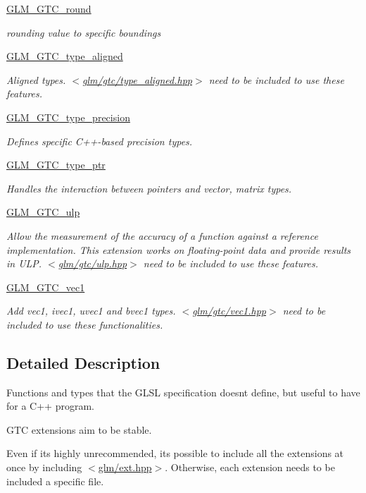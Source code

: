 \begin{DoxyCompactItemize}
\mbox{\hyperlink{group__gtc__round}{G\+L\+M\+\_\+\+G\+T\+C\+\_\+round}}
\begin{DoxyCompactList}\small\item\em rounding value to specific boundings \end{DoxyCompactList}\item 
\mbox{\hyperlink{group__gtc__type__aligned}{G\+L\+M\+\_\+\+G\+T\+C\+\_\+type\+\_\+aligned}}
\begin{DoxyCompactList}\small\item\em Aligned types. $<$\mbox{\hyperlink{gtc_2type__aligned_8hpp}{glm/gtc/type\+\_\+aligned.\+hpp}}$>$ need to be included to use these features. \end{DoxyCompactList}\item 
\mbox{\hyperlink{group__gtc__type__precision}{G\+L\+M\+\_\+\+G\+T\+C\+\_\+type\+\_\+precision}}
\begin{DoxyCompactList}\small\item\em Defines specific C++-\/based precision types. \end{DoxyCompactList}\item 
\mbox{\hyperlink{group__gtc__type__ptr}{G\+L\+M\+\_\+\+G\+T\+C\+\_\+type\+\_\+ptr}}
\begin{DoxyCompactList}\small\item\em Handles the interaction between pointers and vector, matrix types. \end{DoxyCompactList}\item 
\mbox{\hyperlink{group__gtc__ulp}{G\+L\+M\+\_\+\+G\+T\+C\+\_\+ulp}}
\begin{DoxyCompactList}\small\item\em Allow the measurement of the accuracy of a function against a reference implementation. This extension works on floating-\/point data and provide results in U\+LP. $<$\mbox{\hyperlink{ulp_8hpp}{glm/gtc/ulp.\+hpp}}$>$ need to be included to use these features. \end{DoxyCompactList}\item 
\mbox{\hyperlink{group__gtc__vec1}{G\+L\+M\+\_\+\+G\+T\+C\+\_\+vec1}}
\begin{DoxyCompactList}\small\item\em Add vec1, ivec1, uvec1 and bvec1 types. $<$\mbox{\hyperlink{vec1_8hpp}{glm/gtc/vec1.\+hpp}}$>$ need to be included to use these functionalities. \end{DoxyCompactList}\end{DoxyCompactItemize}


\subsection{Detailed Description}
Functions and types that the G\+L\+SL specification doesn\textquotesingle{}t define, but useful to have for a C++ program. 

G\+TC extensions aim to be stable.

Even if it\textquotesingle{}s highly unrecommended, it\textquotesingle{}s possible to include all the extensions at once by including $<$\mbox{\hyperlink{ext_8hpp}{glm/ext.\+hpp}}$>$. Otherwise, each extension needs to be included a specific file. 